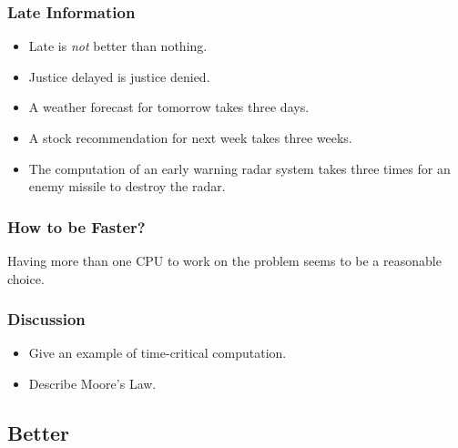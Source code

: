 \documentclass{beamer}
\begin{document}
\begin{CJK}{UTF8}{bsmi}
\begin{frame}
\frametitle{Late Information}
\begin{itemize}
\item Late is {\em not} better than nothing.
\item Justice delayed is justice denied.
\item A weather forecast for tomorrow takes three days.
\item A stock recommendation for next week takes three weeks.
\item The computation of an early warning radar system takes three
  times for an enemy missile to destroy the radar.
\end{itemize}
\end{frame}

\begin{frame}
\frametitle{How to be Faster?}
\Huge Having more than one CPU to work on the problem seems to be a
  reasonable choice.
\end{frame}

\begin{frame}
\frametitle{Discussion} \Large 
\begin{itemize}
\item Give an example of time-critical computation.
\item Describe Moore's Law.
\end{itemize}
\end{frame}



\subsection{Better}


\end{CJK}
\end{document}
